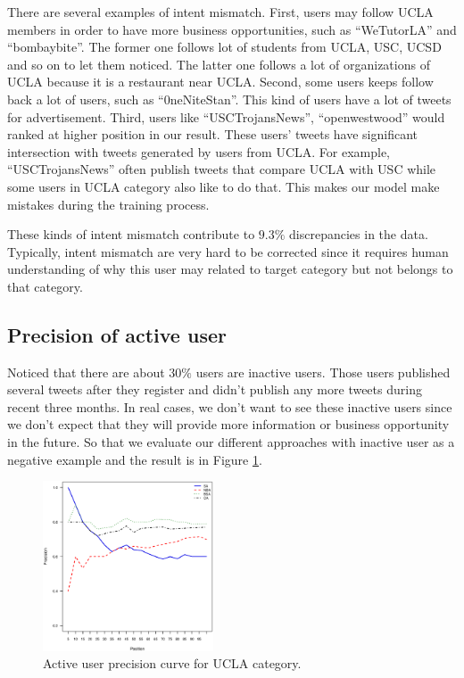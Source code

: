 \documentclass{article}
\begin{document}
There are several examples of intent mismatch. First, users may follow UCLA members in order to have more business opportunities, such as ``WeTutorLA'' and ``bombaybite''. The former one follows lot of students from UCLA, USC, UCSD and so on to let them noticed. The latter one follows a lot of organizations of UCLA because it is a restaurant near UCLA. Second, some users keeps follow back a lot of users, such as ``0neNiteStan''. This kind of users have a lot of tweets for advertisement. Third, users like ``USCTrojansNews'', ``openwestwood'' would ranked at higher position in our result. These users' tweets have significant intersection with tweets generated by users from UCLA. For example, ``USCTrojansNews'' often publish tweets that compare UCLA with USC while some users in UCLA category also like to do that. This makes our model make mistakes during the training process.

These kinds of intent mismatch contribute to $9.3\%$ discrepancies in the data. Typically, intent mismatch are very hard to be corrected since it requires human understanding of why this user may related to target category but not belongs to that category.

\subsection{Precision of active user}

Noticed that there are about $30\%$ users are inactive users. Those users published several tweets after they register and didn't publish any more tweets during recent three months. In real cases, we don't want to see these inactive users since we don't expect that they will provide more information or business opportunity in the future. So that we evaluate our different approaches with inactive user as a negative example and the result is in Figure \ref{fig:activeprecision}.

\begin{figure}[h]
\centering
\includegraphics[width=0.45\textwidth]{experiment/ap.eps}
\caption{Active user precision curve for UCLA category.}
\label{fig:activeprecision}
\end{figure}
\end{document}
